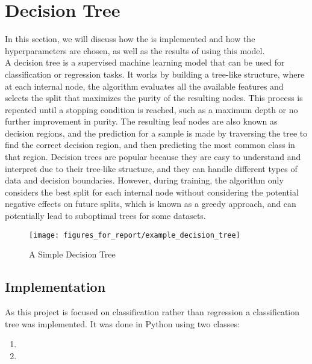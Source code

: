 \section{Decision Tree}
In this section, we will discuss how the  is implemented and how the hyperparameters are chosen, as well as the results of using this model.\\

A decision tree is a supervised machine learning model that can be used for classification or regression tasks.
It works by building a tree-like structure, where at each internal node, the algorithm evaluates all the available features and selects the split that maximizes the purity of the resulting nodes.
This process is repeated until a stopping condition is reached, such as a maximum depth or no further improvement in purity.
The resulting leaf nodes are also known as decision regions, and the prediction for a sample is made by traversing the tree to find the correct decision region, and then predicting the most common class in that region.
Decision trees are popular because they are easy to understand and interpret due to their tree-like structure, and they can handle different types of data and decision boundaries.
However, during training, the algorithm only considers the best split for each internal node without considering the potential negative effects on future splits, which is known as a greedy approach, and can potentially lead to suboptimal trees for some datasets.

\begin{figure}[H]
    \centering
    \texttt{[image: figures\_for\_report/example\_decision\_tree]}
    \captionsetup{justification=centering,margin=2cm}
    \caption{A Simple Decision Tree}
\end{figure}


\subsection{Implementation}
As this project is focused on classification rather than regression a classification tree was implemented.
It was done in Python using two classes:\\
\begin{enumerate}
    \item {}
    \item {}
    \end{enumerate}
\vspace{10pt}

